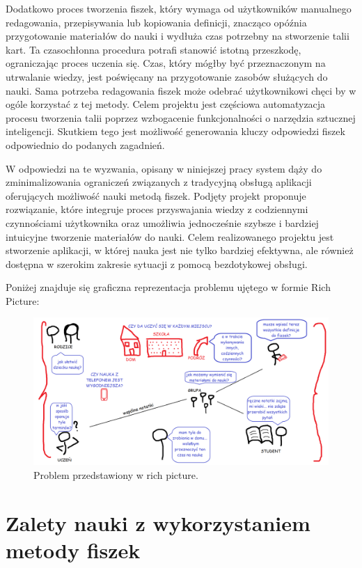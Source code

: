 Dodatkowo proces tworzenia fiszek, który wymaga od użytkowników manualnego redagowania, przepisywania lub kopiowania definicji, znacząco opóźnia przygotowanie materiałów do nauki i wydłuża czas potrzebny na stworzenie talii kart. Ta czasochłonna procedura potrafi stanowić istotną przeszkodę, ograniczając proces uczenia się. Czas, który mógłby być przeznaczonym na utrwalanie wiedzy, jest poświęcany na przygotowanie zasobów służących do nauki. Sama potrzeba redagowania fiszek może odebrać użytkownikowi chęci by w ogóle korzystać z tej metody. Celem projektu jest częściowa automatyzacja procesu tworzenia talii poprzez wzbogacenie funkcjonalności o narzędzia sztucznej inteligencji. Skutkiem tego jest możliwość generowania kluczy odpowiedzi fiszek odpowiednio do podanych zagadnień.

W odpowiedzi na te wyzwania, opisany w niniejszej pracy system dąży do zminimalizowania ograniczeń związanych z tradycyjną obsługą aplikacji oferujących możliwość nauki metodą fiszek. Podjęty projekt proponuje rozwiązanie, które integruje proces przyswajania wiedzy z codziennymi czynnościami użytkownika oraz umożliwia jednocześnie szybsze i bardziej intuicyjne tworzenie materiałów do nauki. Celem realizowanego projektu jest stworzenie aplikacji, w której nauka jest nie tylko bardziej efektywna, ale również dostępna w szerokim zakresie sytuacji z pomocą bezdotykowej obsługi.


Poniżej znajduje się graficzna reprezentacja problemu ujętego w formie Rich Picture:
\begin{figure}[H]
    \centering
    \includegraphics[width=1\textwidth]{chapters/chapter_2/rich_picture.png}
    \caption{Problem przedstawiony w rich picture.}
    \label{img:rich_picture}
\end{figure}


\section{Zalety nauki z wykorzystaniem metody fiszek}

